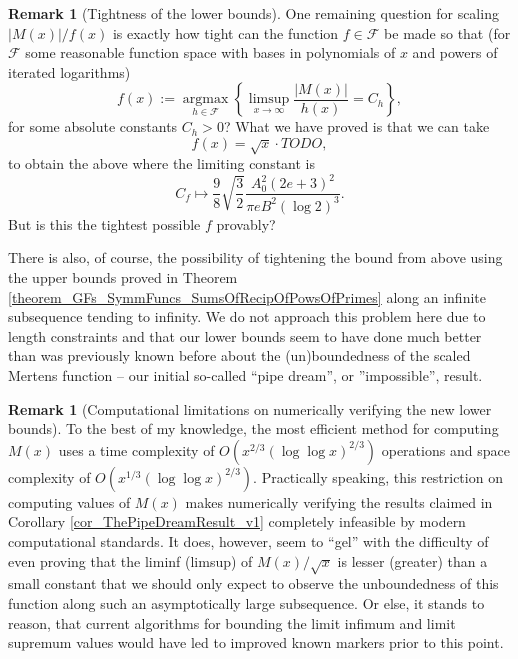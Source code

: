 \documentclass[11pt,reqno,a4letter]{article}
\numberwithin{figure}{section}
\numberwithin{table}{section}
\theoremstyle{plain}
\numberwithin{theorem}{section}
\theoremstyle{definition}
\newtheorem{remark}[theorem]{Remark}
\begin{document}
\begin{remark}[Tightness of the lower bounds] 
One remaining question for scaling $|M(x)| / f(x)$ is exactly how tight can the function 
$f \in \mathcal{F}$ be made so that 
(for $\mathcal{F}$ some reasonable function space with bases in polynomials of $x$ and 
powers of iterated logarithms) 
\[
f(x) := 
     \operatorname{argmax}\limits_{h \in \mathcal{F}} 
     \left\{\limsup_{x \rightarrow \infty} \frac{|M(x)|}{h(x)} = C_h \right\},  
\] 
for some absolute constants $C_h > 0$? 
What we have proved is that we can take 
\[
f(x) =  \sqrt{x} \cdot TODO, 
\]
to obtain the above where the limiting constant is 
$$C_f \mapsto \frac{9}{8} \sqrt{\frac{3}{2}} \frac{A_0^2 (2e+3)^2}{\pi e B^2 (\log 2)^3}.$$ 
But is this the tightest possible $f$ provably? 

There is also, of course, 
the possibility of tightening the bound from above using the upper bounds proved in 
Theorem \ref{theorem_GFs_SymmFuncs_SumsOfRecipOfPowsOfPrimes} 
along an infinite subsequence tending to infinity. 
We do not approach this problem here 
due to length constraints and that our lower bounds seem to have done much better than was 
previously known before about the (un)boundedness of the scaled Mertens function -- our initial 
so-called ``pipe dream'', or ''impossible'', result.  
\end{remark} 

\begin{remark}[Computational limitations on numerically verifying the new lower bounds] 
\label{remark_computation_of_Mx} 
To the best of my knowledge, the most efficient method for computing $M(x)$ uses a time complexity of 
$O\left(x^{2/3} (\log\log x)^{2/3}\right)$ operations and space complexity of 
$O\left(x^{1/3} (\log\log x)^{2/3}\right)$. Practically speaking, this restriction on computing values of 
$M(x)$ makes numerically verifying the results claimed in 
Corollary \ref{cor_ThePipeDreamResult_v1} completely infeasible by modern computational standards. 
It does, however, seem to ``gel'' with the difficulty of even proving that the liminf (limsup) 
of $M(x) / \sqrt{x}$ is lesser (greater) than a small constant that we should only expect to observe 
the unboundedness of this function along such an asymptotically large subsequence. Or else, it stands to 
reason, that current algorithms for bounding the limit infimum and limit supremum values would have led to 
improved known markers prior to this point. 
\end{remark} 
\end{document}
